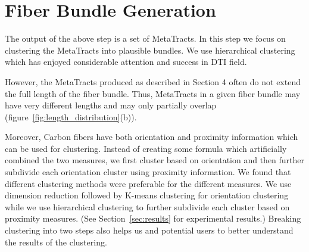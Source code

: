 \section {Fiber Bundle Generation}
\label{subsec:fiber-bundles}
The output of the above step is a set of MetaTracts. In this step we focus on clustering the MetaTracts into plausible bundles. We use hierarchical clustering which has enjoyed considerable attention and success in DTI field. 

However, the MetaTracts produced as described in Section 4 often do not extend the full length of the fiber bundle.  Thus, MetaTracts
in a given fiber bundle may have very different lengths and may only partially overlap (figure~\ref{fig:length_distribution}(b)).

Moreover, Carbon fibers have both orientation and proximity information which can be used for clustering. Instead of creating some formula
which artificially combined the two measures,  we first cluster based on orientation and then further subdivide each orientation cluster using proximity information. We found that different clustering methods were preferable
for the different measures. We use dimension reduction followed by K-means clustering
for orientation clustering while we use hierarchical clustering to further subdivide each cluster
based on proximity measures. (See Section~\ref{sec:results} for experimental results.) Breaking clustering into two steps also helps us and potential users
to better understand the results of the clustering.








